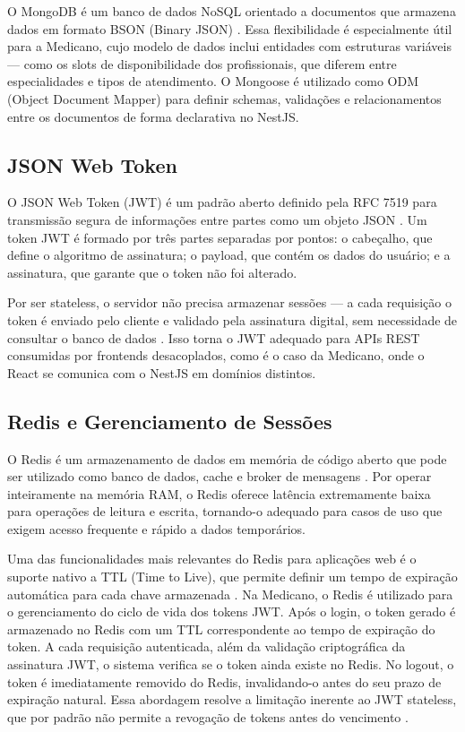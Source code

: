 O MongoDB é um banco de dados NoSQL orientado a
documentos que armazena dados em formato BSON (Binary
JSON) \cite{sadalage2012}. Essa flexibilidade é
especialmente útil para a Medicano, cujo modelo de
dados inclui entidades com estruturas variáveis —
como os slots de disponibilidade dos profissionais,
que diferem entre especialidades e tipos de
atendimento. O Mongoose é utilizado como ODM (Object
Document Mapper) para definir schemas, validações e
relacionamentos entre os documentos de forma
declarativa no NestJS.

\subsection{JSON Web Token}
\label{subsec:jwt}

O JSON Web Token (JWT) é um padrão aberto definido pela
RFC 7519 para transmissão segura de informações entre
partes como um objeto JSON \cite{rfc7519}. Um token JWT
é formado por três partes separadas por pontos: o
cabeçalho, que define o algoritmo de assinatura; o
payload, que contém os dados do usuário; e a assinatura,
que garante que o token não foi alterado.

Por ser stateless, o servidor não precisa armazenar
sessões — a cada requisição o token é enviado pelo
cliente e validado pela assinatura digital, sem
necessidade de consultar o banco de dados \cite{rfc7519}.
Isso torna o JWT adequado para APIs REST consumidas por
frontends desacoplados, como é o caso da Medicano, onde
o React se comunica com o NestJS em domínios distintos.

\subsection{Redis e Gerenciamento de Sessões}
\label{subsec:redis}

O Redis é um armazenamento de dados em memória de
código aberto que pode ser utilizado como banco de
dados, cache e broker de mensagens \cite{redis2024}.
Por operar inteiramente na memória RAM, o Redis oferece
latência extremamente baixa para operações de leitura
e escrita, tornando-o adequado para casos de uso que
exigem acesso frequente e rápido a dados temporários.

Uma das funcionalidades mais relevantes do Redis para
aplicações web é o suporte nativo a TTL (Time to Live),
que permite definir um tempo de expiração automática
para cada chave armazenada \cite{redis2024}. Na
Medicano, o Redis é utilizado para o gerenciamento
do ciclo de vida dos tokens JWT. Após o login, o token
gerado é armazenado no Redis com um TTL correspondente
ao tempo de expiração do token. A cada requisição
autenticada, além da validação criptográfica da
assinatura JWT, o sistema verifica se o token ainda
existe no Redis. No logout, o token é imediatamente
removido do Redis, invalidando-o antes do seu prazo
de expiração natural. Essa abordagem resolve a
limitação inerente ao JWT stateless, que por padrão
não permite a revogação de tokens antes do vencimento
\cite{rfc7519}.

